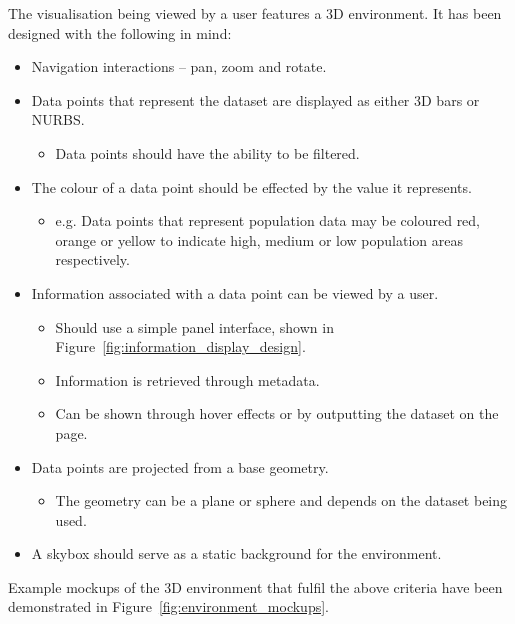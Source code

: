 {{		The visualisation being viewed by a user features a 3D environment. It has been designed with the following in mind:

		\begin{itemize}
			\item Navigation interactions -- pan, zoom and rotate.
			\item Data points that represent the dataset are displayed as either 3D bars or NURBS.
				\begin{itemize}
					\item Data points should have the ability to be filtered.
				\end{itemize}
			\item The colour of a data point should be effected by the value it represents.
				\begin{itemize}
					\item e.g. Data points that represent population data may be coloured red, orange or yellow to indicate high, medium or low population areas respectively.
				\end{itemize}
			\item Information associated with a data point can be viewed by a user.
				\begin{itemize}
					\item Should use a simple panel interface, shown in Figure~\ref{fig:information_display_design}.
					\item Information is retrieved through metadata. 
					\item Can be shown through hover effects or by outputting the dataset on the page.
				\end{itemize}
			\item Data points are projected from a base geometry.
				\begin{itemize}
					\item The geometry can be a plane or sphere and depends on the dataset being used.
				\end{itemize}
			\item A skybox should serve as a static background for the environment.
		\end{itemize}

		

		Example mockups of the 3D environment that fulfil the above criteria have been demonstrated in Figure~\ref{fig:environment_mockups}.

		

}}
